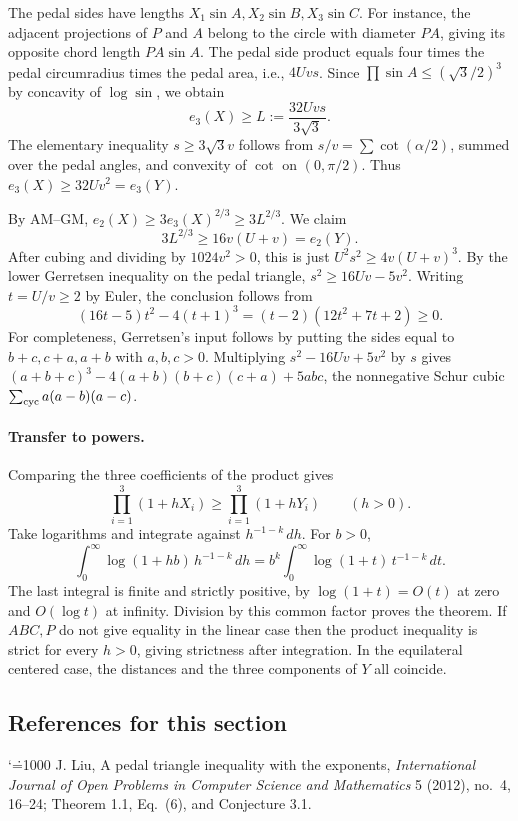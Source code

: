 \documentclass[11pt,a4paper]{article}
\makeatletter
\numberwithin{equation}{section}
\theoremstyle{definition}
\theoremstyle{remark}
\renewenvironment{thebibliography}[1]
 {\subsection*{References for this section}\small
  \list{\@biblabel{\@arabic\c@enumiv}}
       {\settowidth\labelwidth{\@biblabel{#1}}\leftmargin\labelwidth
        \advance\leftmargin\labelsep\@openbib@code
        \usecounter{enumiv}\let\p@enumiv\@empty
        \renewcommand\theenumiv{\@arabic\c@enumiv}}
  \sloppy\clubpenalty4000\widowpenalty4000\sfcode`\.=1000\relax}
 {\def\@noitemerr{\@latex@warning{Empty bibliography}}\endlist}
\makeatother
\begin{document}
The pedal sides have lengths $X_1\sin A,X_2\sin B,X_3\sin C$. For instance, the adjacent projections of $P$ and $A$ belong to the circle with diameter $PA$, giving its opposite chord length $PA\sin A$. The pedal side product equals four times the pedal circumradius times the pedal area, i.e., $4Uvs$. Since $\prod\sin A\le(\sqrt3/2)^3$ by concavity of $\log\sin$, we obtain
\[
 e_3(X)\ge L:=\frac{32Uvs}{3\sqrt3}.
\]
The elementary inequality $s\ge3\sqrt3 v$ follows from $s/v=\sum\cot(\alpha/2)$, summed over the pedal angles, and convexity of $\cot$ on $(0,\pi/2)$. Thus $e_3(X)\ge 32Uv^2=e_3(Y)$.

By AM--GM, $e_2(X)\ge 3e_3(X)^{2/3}\ge 3L^{2/3}$. We claim
\[
 3L^{2/3}\ge16v(U+v)=e_2(Y).
\]
After cubing and dividing by $1024v^2>0$, this is just $U^2s^2\ge4v(U+v)^3$. By the lower Gerretsen inequality on the pedal triangle, $s^2\ge16Uv-5v^2$. Writing $t=U/v\ge2$ by Euler, the conclusion follows from
\[
 (16t-5)t^2-4(t+1)^3=(t-2)(12t^2+7t+2)\ge0.
\]
For completeness, Gerretsen's input follows by putting the sides equal to $b+c,c+a,a+b$ with $a,b,c>0$. Multiplying $s^2-16Uv+5v^2$ by $s$ gives $(a+b+c)^3-4(a+b)(b+c)(c+a)+5abc$, the nonnegative Schur cubic $\sum_{\rm cyc}a(a-b)(a-c)$.

\paragraph{Transfer to powers.}
Comparing the three coefficients of the product gives
\[
 \prod_{i=1}^3(1+hX_i)\ge\prod_{i=1}^3(1+hY_i)\qquad(h>0).
\]
Take logarithms and integrate against $h^{-1-k}\,dh$. For $b>0$,
\[
 \int_0^\infty\!\log(1+hb)\,h^{-1-k}\,dh
 = b^k\int_0^\infty\!\log(1+t)\,t^{-1-k}\,dt.
\]
The last integral is finite and strictly positive, by $\log(1+t)=O(t)$ at zero and $O(\log t)$ at infinity. Division by this common factor proves the theorem. If $ABC,P$ do not give equality in the linear case then the product inequality is strict for every $h>0$, giving strictness after integration. In the equilateral centered case, the distances and the three components of $Y$ all coincide.
\begin{thebibliography}{1}
 J. Liu, A pedal triangle inequality with the exponents, \textit{International Journal of Open Problems in Computer Science and Mathematics} 5 (2012), no.~4, 16--24; Theorem 1.1, Eq.~(6), and Conjecture 3.1.
\end{thebibliography}

\par\endgroup
\end{document}
